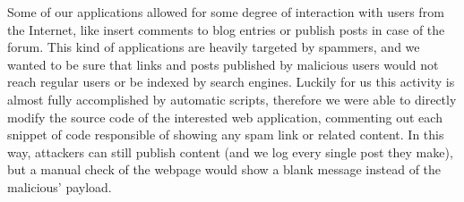 Some of our applications allowed for some degree of interaction with users from the Internet, like insert comments to blog entries or publish posts in case of the forum. This kind of applications are heavily targeted by spammers, and we wanted to be sure that links and posts published by malicious users would not reach regular users or be indexed by search engines. Luckily for us this activity is almost fully accomplished by automatic scripts, therefore we were able to directly modify the source code of the interested web application, commenting out each snippet of code responsible of showing any spam link or related content. In this way, attackers can still publish content (and we log every single post they make), but a manual check of the webpage would show a blank message instead of the malicious' payload.
